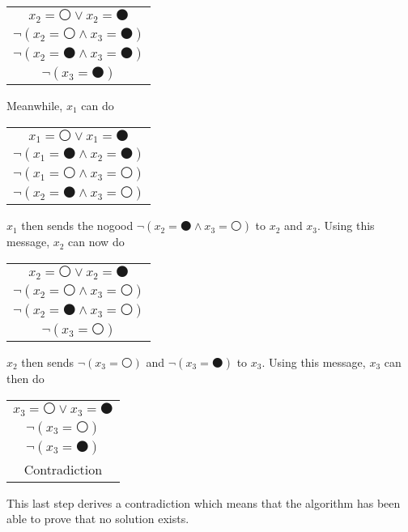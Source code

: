 \begin{center}
  \begin{tabular}{c}
    \phantom{$\neg ($}$x_2 = \medcirc \vee x_2 = \medbullet$\phantom{$)$} \\
    $\neg(x_2 = \medcirc \wedge x_3 = \medbullet)$ \\
    $\neg(x_2 = \medbullet \wedge x_3 = \medbullet)$ \\ \midrule
    $\neg(x_3 = \medbullet)$
  \end{tabular}
\end{center}
Meanwhile, $x_1$ can do
\begin{center}
  \begin{tabular}{c}
    \phantom{$\neg ($}$x_1 = \medcirc \vee x_1 = \medbullet$\phantom{$)$} \\
    $\neg(x_1 = \medbullet \wedge x_2 = \medbullet)$ \\
    $\neg(x_1 = \medcirc \wedge x_3 = \medcirc)$ \\ \midrule
    $\neg(x_2 = \medbullet \wedge x_3 = \medcirc)$ 
  \end{tabular}
\end{center}
$x_1$ then sends the nogood $\neg(x_2 = \medbullet \wedge x_3 = \medcirc)$ to
$x_2$ and $x_3$. Using this message, $x_2$ can now do
\begin{center}
  \begin{tabular}{c}
    \phantom{$\neg ($}$x_2 = \medcirc \vee x_2 = \medbullet$\phantom{$)$} \\
    $\neg(x_2 = \medcirc \wedge x_3 = \medcirc)$ \\
    $\neg(x_2 = \medbullet \wedge x_3 = \medcirc)$ \\ \midrule
    $\neg(x_3 = \medcirc)$
  \end{tabular}
\end{center}
$x_2$ then sends $\neg(x_3 = \medcirc)$ and $\neg(x_3 = \medbullet)$
to $x_3$. Using this message, $x_3$ can then do
\begin{center}
  \begin{tabular}{c}
    $x_3 = \medcirc \vee x_3 = \medbullet$ \\
    $\neg(x_3 = \medcirc)$ \\
    $\neg(x_3 = \medbullet)$ \\ \midrule
    Contradiction
  \end{tabular}
\end{center}
This last step derives a contradiction which means that the algorithm
has been able to prove that no solution exists.


